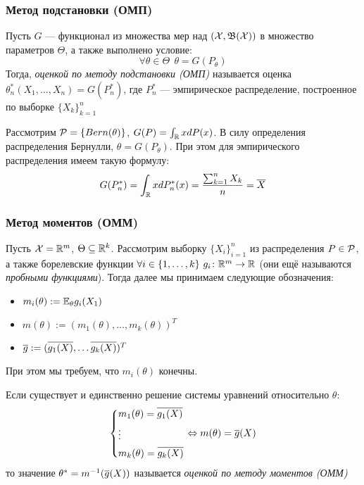 \subsubsection*{Метод подстановки (ОМП)}

\begin{definition}
	Пусть $G$ --- функционал из множества мер над $(\mathcal{X}, \mathfrak{B}(\mathcal{X}))$ в множество параметров $\Theta$, а также выполнено условие:
	\[
		\forall \theta \in \Theta\ \ \theta = G(P_\theta)
	\]
	Тогда, \textit{оценкой по методу подстановки (ОМП)} называется оценка $\theta_n^*(X_1, \ldots, X_n) = G(P_n^*)$, где $P_n^*$ --- эмпирическое распределение, построенное по выборке $\{X_k\}_{k = 1}^n$
\end{definition}

\begin{example}
	Рассмотрим $\mathcal{P} = \{Bern(\theta)\}$, $G(P) = \int_{\mathbb{R}} xdP(x)$. В силу определения распределения Бернулли, $\theta = G(P_\theta)$. При этом для эмпирического распределения имеем такую формулу:
	\[
		G(P_n^*) = \int_{\mathbb{R}} xdP_n^*(x) = \frac{\sum_{k = 1}^n X_k}{n} = \overline{X}
	\]
\end{example}

\subsubsection*{Метод моментов (ОММ)}

\begin{note}
	Пусть $\mathcal{X} = \mathbb{R}^m$, $\Theta \subseteq \mathbb{R}^k$. Рассмотрим выборку $\{X_i\}_{i = 1}^n$ из распределения $P \in \mathcal{P}$, а также борелевские функции $\forall i \in \{1, \ldots, k\}\ g_i \colon \mathbb{R}^m \to \mathbb{R}$ (они ещё называются \textit{пробными функциями}). Тогда далее мы принимаем следующие обозначения:
	\begin{itemize}
		\item $m_i(\theta) := \mathbb{E}_\theta g_i(X_1)$
		
		\item $m(\theta) := (m_1(\theta), \ldots, m_k(\theta))^T$
		
		\item $\overline{g} := (\overline{g_1(X)}, \ldots \overline{g_k(X)})^T$
	\end{itemize}
	При этом мы требуем, что $m_i(\theta)$ конечны.
\end{note}

\begin{definition}
	Если существует и единственно решение системы уравнений относительно $\theta$:
	\[
		\left\{\begin{aligned}
			&{m_1(\theta) = \overline{g_1(X)}}
			\\
			&{\vdots}
			\\
			&{m_k(\theta) = \overline{g_k(X)}}
		\end{aligned}\right.
		\Leftrightarrow m(\theta) = \overline{g}(X)
	\]
	то значение $\theta^* = m^{-1}(\overline{g}(X))$ называется \textit{оценкой по методу моментов (ОММ)}
\end{definition}

